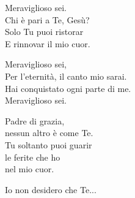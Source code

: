 
\strofa Meraviglioso sei.\\
Chi è pari a Te, Gesù?\\
Solo Tu puoi ristorar\\
E rinnovar il mio cuor.

\spazio

\strofa Meraviglioso sei,\\
Per l'eternità, il canto mio sarai.\\
Hai conquistato ogni parte di me.\\
Meraviglioso sei.

\spazio

\strofa Padre di grazia,\\
nessun altro è come Te.\\
Tu soltanto puoi guarir\\
le ferite che ho\\
nel mio cuor.

\spazio

Io non desidero che Te... 
